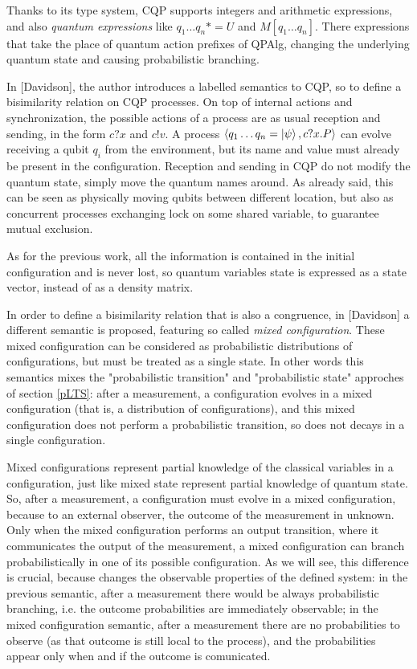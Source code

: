 Thanks to its type system, CQP supports integers and arithmetic expressions, and also \textit{quantum expressions} like $q_1\ldots q_n *= U$ and $M[q_1 \ldots q_n]$. There expressions that take the place of quantum action prefixes of QPAlg, changing the underlying quantum state and causing probabilistic branching.
 

In [Davidson], the author introduces a labelled semantics  to CQP, so to define a bisimilarity relation on CQP processes. On top of internal actions and synchronization, the possible actions of a process are as usual reception and sending, in the form $c?x$ and $c!v$. A process $\langle q_1 \ldots q_n = \ket{\psi}, c?x.P\rangle$ can evolve receiving a qubit $q_i$ from the environment, but its name and value must already be present in the configuration. Reception and sending in CQP do not modify the quantum state, simply move the quantum names around. As already said, this can be seen as physically moving qubits between different location, but also as concurrent processes exchanging lock on some shared variable, to guarantee mutual exclusion.


As for the previous work, all the information is contained in the initial configuration and is never lost, so quantum variables state is expressed as a state vector, instead of as a density matrix.



In order to define a bisimilarity relation that is also a congruence, in [Davidson] a different semantic is proposed, featuring so called \textit{mixed configuration}. These mixed configuration can be considered as probabilistic distributions of configurations, but must be treated as a single state. In other words this semantics mixes the "probabilistic transition" and "probabilistic state" approches of section \ref{pLTS}: after a measurement, a configuration evolves in a mixed configuration (that is, a distribution of configurations), and this mixed configuration does not perform a probabilistic transition, so does not decays in a single configuration. 

Mixed configurations represent partial knowledge of the classical variables in a configuration, just like mixed state represent partial knowledge of quantum state. So, after a measurement, a configuration must evolve in a mixed configuration, because to an external observer, the outcome of the measurement in unknown. Only when the mixed configuration performs an output transition, where it communicates the output of the measurement, a mixed configuration can branch probabilistically in one of its possible configuration. As we will see, this difference is crucial, because changes the observable properties of the defined system: in the previous semantic, after a measurement there would be always probabilistic branching, i.e. the outcome probabilities are immediately observable; in the mixed configuration semantic, after a measurement there are no probabilities to observe (as that outcome is still local to the process), and the probabilities appear only when and if the outcome is comunicated.


